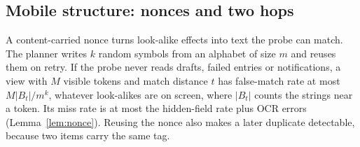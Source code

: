 \subsection{Mobile structure: nonces and two hops}
\label{sec:twohop}
A content-carried nonce turns look-alike effects into text the probe can match. The planner writes $k$ random symbols from an alphabet of size $m$ and reuses them on retry.
If the probe never reads drafts, failed entries or notifications, a view with $M$ visible tokens and match distance $t$ has false-match rate at most $M|B_t|/m^k$, whatever
look-alikes are on screen, where $|B_t|$ counts the strings near a token. Its miss rate is at most the hidden-field rate plus OCR errors (Lemma~\ref{lem:nonce}).
Reusing the nonce also makes a later duplicate detectable, because two items carry the same tag.

